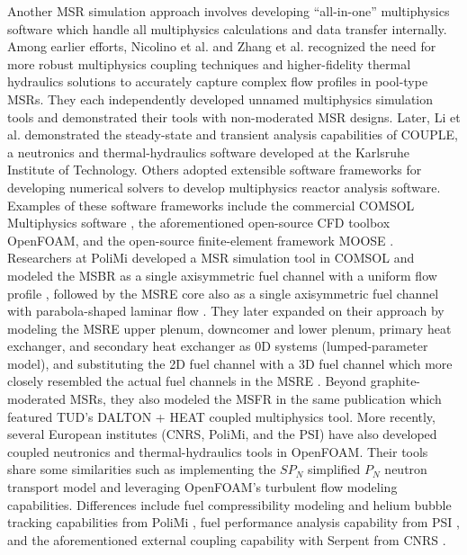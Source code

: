 Another \gls{MSR} simulation approach involves developing ``all-in-one''
multiphysics software which handle all multiphysics calculations and data
transfer internally. Among earlier efforts, Nicolino et al.
\cite{nicolino_coupled_2008} and Zhang et al. \cite{zhang_development_2009}
recognized the
need for more robust multiphysics coupling techniques and higher-fidelity
thermal hydraulics solutions to accurately capture complex flow profiles in
pool-type \glspl{MSR}. They each independently developed unnamed multiphysics
simulation tools and demonstrated their tools with non-moderated \gls{MSR}
designs. Later, Li et al. \cite{li_transient_2015} demonstrated the
steady-state and transient analysis capabilities of COUPLE, a neutronics and
thermal-hydraulics software developed at the Karlsruhe Institute of Technology.
Others adopted extensible software frameworks for developing numerical solvers
to develop multiphysics reactor analysis software. Examples of these software
frameworks include the commercial COMSOL
Multiphysics\textsuperscript{\textregistered} software
\cite{comsol_ab_comsol_nodate}, the aforementioned open-source CFD toolbox
OpenFOAM, and the open-source finite-element
framework \gls{MOOSE} \cite{gaston_physics-based_2015}. Researchers at
\gls{PoliMi} developed a \gls{MSR} simulation tool in COMSOL and
modeled the \gls{MSBR} as a single axisymmetric fuel channel with a uniform
flow profile \cite{cammi_multi-physics_2011}, followed by the \gls{MSRE} core
also as a single axisymmetric fuel channel with parabola-shaped laminar flow
\cite{cammi_dimensional_2012}. They later expanded on their approach by
modeling the \gls{MSRE} upper plenum, downcomer and lower plenum, primary heat
exchanger, and secondary heat exchanger as 0D systems (lumped-parameter model),
and substituting the 2D fuel channel with a 3D fuel channel which more closely
resembled the actual fuel channels in the \gls{MSRE}
\cite{zanetti_geometric_2015}. Beyond graphite-moderated \glspl{MSR}, they
also modeled the \gls{MSFR} in the same publication which featured \gls{TUD}'s
DALTON + HEAT coupled multiphysics tool.
More recently, several European institutes (\gls{CNRS}, \gls{PoliMi},
and the \gls{PSI}) have also developed coupled neutronics and
thermal-hydraulics tools in OpenFOAM. Their tools share some
similarities such as implementing the $SP_N$ simplified $P_N$ neutron transport
model and leveraging OpenFOAM's turbulent flow modeling capabilities.
Differences include fuel compressibility modeling and helium bubble tracking
capabilities from \gls{PoliMi} \cite{cervi_development_2019}, fuel
performance analysis capability from \gls{PSI} \cite{fiorina_creation_2018},
and the aforementioned external coupling capability with Serpent from
\gls{CNRS} \cite{blanco_neutronic_2020}.

